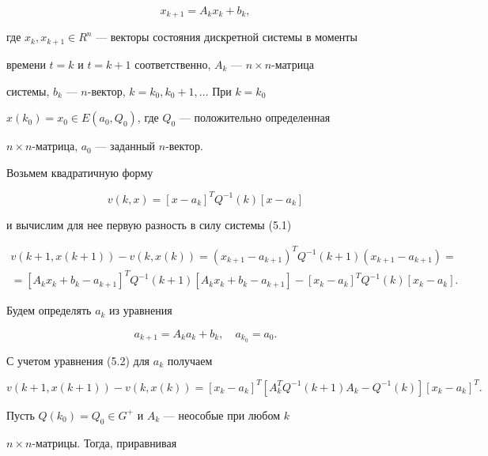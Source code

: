\begin{equation}


x_{k+1}=A_k x_k+b_k,


\end{equation}


где $x_k,x_{k+1}\in R^n$ --- векторы состояния дискретной системы в моменты


времени $t=k$ и $t=k+1$ соответственно, $A_k$ --- $n\times n$-матрица


системы, $b_k$ --- $n$-вектор, $k=k_0,k_0+1,\dotsc$ При $k=k_0$ \


$x(k_0)=x_0\in E(a_0,Q_0)$, где $Q_0$ --- положительно определенная


$n\times n$-матрица, $a_0$ --- заданный $n$-вектор.





Возьмем квадратичную форму


$$


v(k,x)=[x-a_k]^T Q^{-1}(k)[x-a_k]


$$


и вычислим для нее первую разность в силу системы (5.1)


\begin{multline*}


v(k+1,x(k+1))-v(k,x(k))=(x_{k+1}-a_{k+1})^T Q^{-1}(k+1)


(x_{k+1}-a_{k+1})= \\


=[A_k x_k+b_k-a_{k+1}]^T Q^{-1}(k+1)[A_k x_k+b_k-a_{k+1}]-


[x_k-a_k]^T Q^{-1}(k)[x_k-a_k].


\end{multline*}


Будем определять $a_k$ из уравнения


\begin{equation}


a_{k+1}=A_k a_k+b_k,\quad a_{k_0}=a_0.


\end{equation}


С учетом уравнения (5.2) для $a_k$ получаем


$$


v(k+1,x(k+1))-v(k,x(k))=[x_k-a_k]^T[A^T_k Q^{-1}(k+1)A_k-Q^{-1}(k)]


[x_k-a_k]^T.


$$


Пусть $Q(k_0)=Q_0\in G^+$ и $A_k$ --- неособые при любом $k$ \


$n\times n$-матрицы. Тогда, приравнивая


